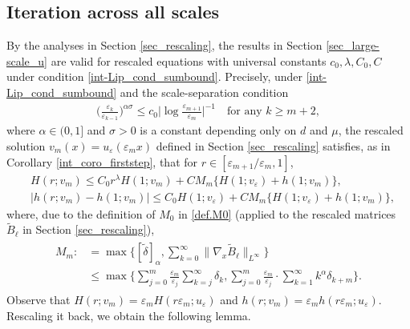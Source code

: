 \documentclass[reqno,12pt]{amsart} %
\theoremstyle{definition}
\theoremstyle{remark}
\numberwithin{equation}{section}
\newcommand{\e}{\varepsilon}
\begin{document}
\subsection{Iteration across all scales}\label{sec_iteration}
By the analyses in Section \ref{sec_rescaling}, the results in Section \ref{sec_large-scale_u} are valid for rescaled equations with universal constants $c_0, \lambda, C_0, C$ under condition \eqref{int-Lip_cond_sumbound}. Precisely, under \eqref{int-Lip_cond_sumbound} and the scale-separation condition 
\begin{align}\label{cond_logseparation_m}
  \bigg(\frac{\varepsilon_k}{\varepsilon_{k-1}}\bigg)^{\alpha\sigma}\leq c_0\Big|\log \frac{\varepsilon_{m+1}}{\varepsilon_m}\Big|^{-1} \quad\text{for any } k\geq m+2,
\end{align}
where $\alpha\in(0, 1]$ and $\sigma>0$ is a constant depending only on $d$ and $\mu$, the rescaled solution $v_m(x) = u_\e(\varepsilon_m x)$ defined in Section \ref{sec_rescaling} satisfies, as in Corollary \ref{int_coro_firststep}, that for $r\in [\varepsilon_{m+1}/\varepsilon_m, 1]$,
\begin{align*}
  & H(r; v_m)\leq C_0 r^\lambda H(1; v_m)+CM_m\{H(1; v_\varepsilon)+h(1; v_m)\},\\
  & |h(r; v_m)-h(1; v_m)|\leq C_0H(1; v_\varepsilon)+CM_m\{H(1; v_\varepsilon)+h(1; v_m)\},
\end{align*}
where, due to the definition of $M_0$ in \eqref{def.M0} (applied to the rescaled matrices $\widetilde{B}_\ell$ in Section \ref{sec_rescaling}), 
\begin{align}\label{int-Lip_def_MN}
\begin{aligned}
  M_m: & = \max \Big\{ [\widetilde{\delta}]_\alpha, \sum_{k=0}^\infty \| \nabla_{x} \widetilde{B}_\ell \|_{L^\infty} \Big\} \\
  & \le \max\bigg\{\sum_{j=0}^{m}\frac{\varepsilon_m}{\varepsilon_j}\sum_{k=j}^{\infty}\delta_k, \sum_{j=0}^m\frac{\varepsilon_m}{\varepsilon_j}\cdot\sum_{k=1}^\infty k^\alpha\delta_{k+m}\bigg\}.
  \end{aligned}
\end{align}
Observe that $H(r; v_m)= \varepsilon_m H(r\varepsilon_m; u_\varepsilon)$ and $h(r; v_m)=\varepsilon_m h(r \varepsilon_m; u_\varepsilon)$. Rescaling it back, we obtain the following lemma.
\end{document}
